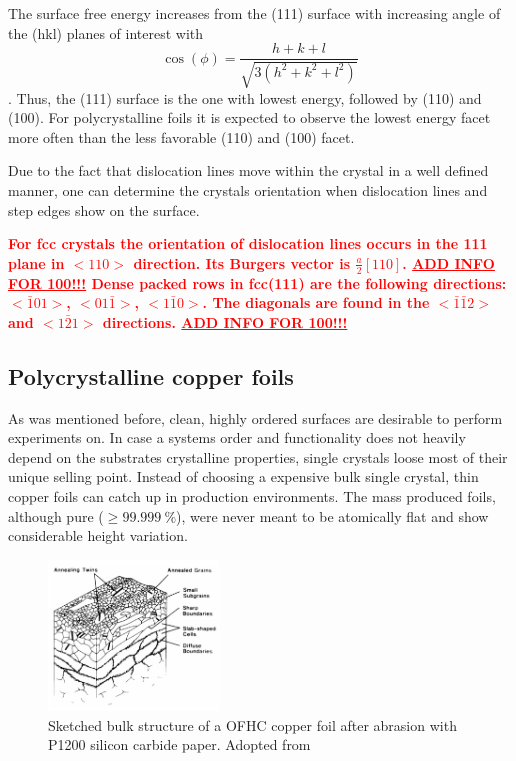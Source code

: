 The surface free energy increases from the (111) surface with increasing angle of the (hkl) planes of interest with $$\cos(\phi)=\frac{h+k+l}{\sqrt{3(h^2+k^2+l^2)}}$$ \cite{jian-min_calculation_2004}. Thus, the (111) surface is the one with lowest energy, followed by (110) and (100). For polycrystalline foils it is expected to observe the lowest energy facet more often than the less favorable (110) and (100) facet.

Due to the fact that dislocation lines move within the crystal in a well defined manner, one can determine the crystals orientation when dislocation lines and step edges show on the surface.

\textcolor{red}{\textbf{
For fcc crystals the orientation of dislocation lines occurs in the {111} plane in $<110>$ direction. Its Burgers vector is $\frac{a}{2}[110]$\cite{_dislocation-theory}. \underline{ADD INFO	FOR 100!!!}
Dense packed rows in fcc(111) are the following directions: $<\bar 1 01>$, $<01\bar 1>$, $<1\bar 1 0>$. The diagonals are found in the $<\bar 1 \bar 1 2>$ and $<1\bar 2 1>$ directions. \underline{ADD INFO	FOR 100!!!}
}}
 
 \subsection{Polycrystalline copper foils}
 
  As was mentioned before, clean, highly ordered surfaces are desirable to perform experiments on. In case a systems order and functionality does not heavily depend on the substrates crystalline properties, single crystals loose most of their unique selling point. Instead of choosing a expensive bulk single crystal, thin copper foils can catch up in production environments. The mass produced foils, although pure ($\geq \SI{99.999}{\percent}$), were never meant to be atomically flat and show considerable height variation.

\begin{figure}\centering
	\includegraphics[height=40mm]{./images/grain-structure-copper-foil}
	\caption{Sketched bulk structure of a OFHC copper foil after abrasion with P1200 silicon carbide paper. Adopted from \cite{turley_nature_1981}}
	\label{fig:copper-foil-grains}
\end{figure}

